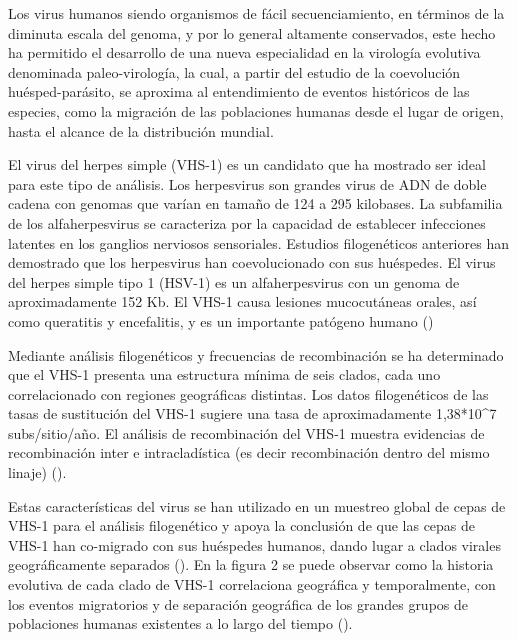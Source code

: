 \documentclass[
  12pt, krantz2,
  spanish,
]{krantz}
\begin{document}
Los virus humanos siendo organismos de fácil secuenciamiento, en términos de la diminuta escala del genoma, y por lo general altamente conservados, este hecho ha permitido el desarrollo de una nueva especialidad en la virología evolutiva denominada paleo-virología, la cual, a partir del estudio de la coevolución huésped-parásito, se aproxima al entendimiento de eventos históricos de las especies, como la migración de las poblaciones humanas desde el lugar de origen, hasta el alcance de la distribución mundial.

El virus del herpes simple (VHS-1) es un candidato que ha mostrado ser ideal para este tipo de análisis. Los herpesvirus son grandes virus de ADN de doble cadena con genomas que varían en tamaño de 124 a 295 kilobases. La subfamilia de los alfaherpesvirus se caracteriza por la capacidad de establecer infecciones latentes en los ganglios nerviosos sensoriales. Estudios filogenéticos anteriores han demostrado que los herpesvirus han coevolucionado con sus huéspedes. El virus del herpes simple tipo 1 (HSV-1) es un alfaherpesvirus con un genoma de aproximadamente 152 Kb. El VHS-1 causa lesiones mucocutáneas orales, así como queratitis y encefalitis, y es un importante patógeno humano (\citet{kolb2013using})

Mediante análisis filogenéticos y frecuencias de recombinación se ha determinado que el VHS-1 presenta una estructura mínima de seis clados, cada uno correlacionado con regiones geográficas distintas. Los datos filogenéticos de las tasas de sustitución del VHS-1 sugiere una tasa de aproximadamente 1,38*10\^{}7 subs/sitio/año. El análisis de recombinación del VHS-1 muestra evidencias de recombinación inter e intracladística (es decir recombinación dentro del mismo linaje) (\citet{kolb2013using}).

Estas características del virus se han utilizado en un muestreo global de cepas de VHS-1 para el análisis filogenético y apoya la conclusión de que las cepas de VHS-1 han co-migrado con sus huéspedes humanos, dando lugar a clados virales geográficamente separados (\citet{kolb2013using}). En la figura 2 se puede observar como la historia evolutiva de cada clado de VHS-1 correlaciona geográfica y temporalmente, con los eventos migratorios y de separación geográfica de los grandes grupos de poblaciones humanas existentes a lo largo del tiempo (\citet{kolb2013using}).
\end{document}
